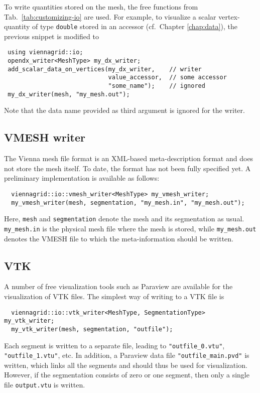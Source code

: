  To write quantities stored on the mesh, the free functions from Tab.~\ref{tab:customizing-io} are used.
 For example, to visualize a scalar vertex-quantity of type \lstinline|double| stored in an accessor (cf.~Chapter \ref{chap:data}), the previous snippet is modified to
 \begin{lstlisting}
 using viennagrid::io;
 opendx_writer<MeshType> my_dx_writer;
 add_scalar_data_on_vertices(my_dx_writer,    // writer
                             value_accessor,  // some accessor
                             "some_name");    // ignored
 my_dx_writer(mesh, "my_mesh.out");
 \end{lstlisting}
 Note that the data name provided as third argument is ignored for the {\OpenDX} writer.


 \subsection{VMESH writer}
 The Vienna mesh file format is an XML-based meta-description format and does not store the mesh itself.
 To date, the format has not been fully specified yet. A preliminary implementation is available as follows:
 \begin{lstlisting}
  viennagrid::io::vmesh_writer<MeshType> my_vmesh_writer;
  my_vmesh_writer(mesh, segmentation, "my_mesh.in", "my_mesh.out");
 \end{lstlisting}
 Here, \lstinline|mesh| and \lstinline|segmentation| denote the mesh and its segmentation as usual.
 \lstinline|my_mesh.in| is the physical mesh file where the mesh is stored, while \lstinline|my_mesh.out| denotes the VMESH file to which the meta-information should be written.

 \subsection{VTK}
 A number of free visualization tools such as Paraview \cite{paraview} are available for the visualization of VTK files.
 The simplest way of writing to a VTK file is
 \begin{lstlisting}
  viennagrid::io::vtk_writer<MeshType, SegmentationType> my_vtk_writer;
  my_vtk_writer(mesh, segmentation, "outfile");
 \end{lstlisting}
 Each segment is written to a separate file, leading to \lstinline|"outfile_0.vtu"|, \lstinline|"outfile_1.vtu"|, etc. In addition,
 a Paraview data file \lstinline|"outfile_main.pvd"| is written, which links all the segments and should thus be used for visualization.
 However, if the segmentation consists of zero or one segment, then only a single file \lstinline|output.vtu| is written.


